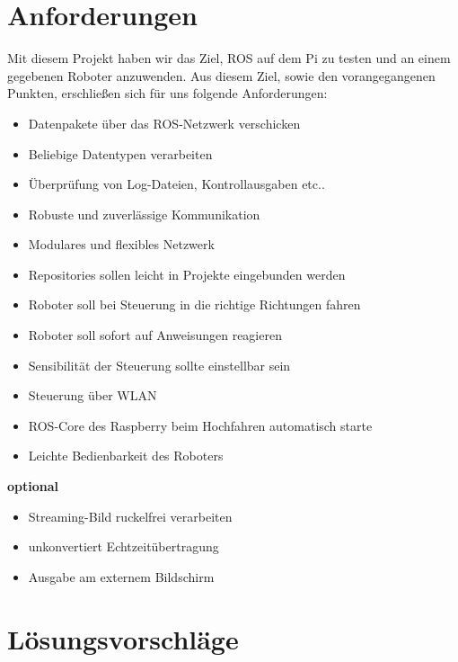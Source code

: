 \documentclass[12pt]{article}
\begin{document}
\section{Anforderungen}

Mit diesem Projekt haben wir das Ziel, ROS auf dem Pi zu testen und an einem gegebenen Roboter anzuwenden. Aus diesem Ziel, sowie den vorangegangenen Punkten, erschließen sich für uns folgende Anforderungen:
\vspace{0,4cm}
\begin{itemize}
\item Datenpakete über das ROS-Netzwerk verschicken
\item Beliebige Datentypen verarbeiten
\item Überprüfung von Log-Dateien, Kontrollausgaben etc..
\item Robuste und zuverlässige Kommunikation
\item Modulares und flexibles Netzwerk
\item Repositories sollen leicht in Projekte eingebunden werden

\vspace{0,6cm}

\item Roboter soll bei Steuerung in die richtige Richtungen fahren
\item Roboter soll sofort auf Anweisungen reagieren
\item Sensibilität der Steuerung sollte einstellbar sein
\item Steuerung über WLAN
\item ROS-Core des Raspberry beim Hochfahren automatisch starte
\item Leichte Bedienbarkeit des Roboters

\vspace{0,6cm}

\end{itemize}

{\bf optional}

\begin{itemize}
\item Streaming-Bild ruckelfrei verarbeiten
\item unkonvertiert Echtzeitübertragung
\item Ausgabe am externem Bildschirm
\end{itemize}


\section{Lösungsvorschläge}
\end{document}
